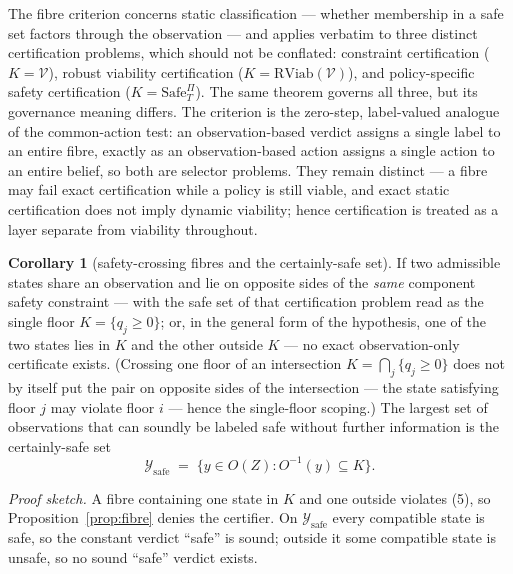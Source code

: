 \documentclass[10pt,twocolumn]{article}
\theoremstyle{definition}
\newtheorem{corollary}{Corollary}
\begin{document}
The fibre criterion concerns static classification --- whether
membership in a safe set factors through the observation --- and applies
verbatim to three distinct certification problems, which should not be
conflated: constraint certification (\(K = \mathcal{V}\)), robust
viability certification (\(K = \mathrm{RViab}(\mathcal{V})\)), and
policy-specific safety certification (\(K = \mathrm{Safe}^{\Pi}_T\)).
The same theorem governs all three, but its governance meaning differs.
The criterion is the zero-step, label-valued analogue of the
common-action test: an observation-based verdict assigns a single label
to an entire fibre, exactly as an observation-based action assigns a
single action to an entire belief, so both are selector problems. They
remain distinct --- a fibre may fail exact certification while a policy
is still viable, and exact static certification does not imply dynamic
viability; hence certification is treated as a layer separate from
viability throughout.

\begin{corollary}[safety-crossing fibres and the certainly-safe set]\label{cor:certainly-safe} If two admissible states share an observation and lie on opposite
sides of the \emph{same} component safety constraint --- with the safe
set of that certification problem read as the single floor
\(K = \{ q_j \ge 0 \}\); or, in the general form of the hypothesis, one
of the two states lies in \(K\) and the other outside \(K\) --- no exact
observation-only certificate exists. (Crossing one floor of an
intersection \(K = \bigcap_j \{ q_j \ge 0 \}\) does not by itself put
the pair on opposite sides of the intersection --- the state satisfying
floor \(j\) may violate floor \(i\) --- hence the single-floor scoping.)
The largest set of observations that can soundly be labeled safe without
further information is the certainly-safe set
\[\mathcal{Y}_{\mathrm{safe}} \;=\; \big\{ y \in O(Z) : O^{-1}(y) \subseteq K \big\}.\]

\end{corollary}

\emph{Proof sketch.} A fibre containing one state in \(K\) and one outside violates (5), so Proposition~\ref{prop:fibre} denies the certifier. On \(\mathcal{Y}_{\mathrm{safe}}\) every compatible state is safe, so the constant verdict ``safe'' is sound; outside it some compatible state is unsafe, so no sound ``safe'' verdict exists.
\end{document}
